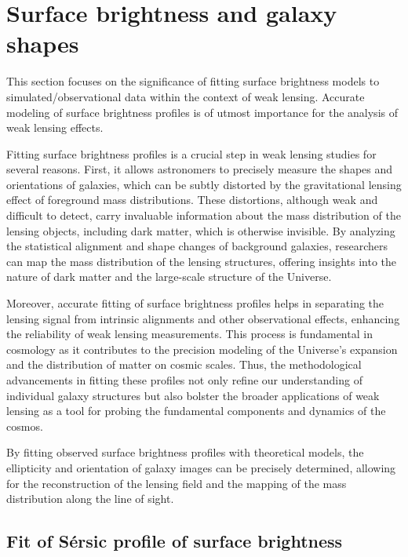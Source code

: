 \section{Surface brightness and galaxy shapes}
\label{sec:fit_light}

This section focuses on the significance of fitting surface brightness models to simulated/observational data within the context of weak lensing.
Accurate modeling of surface brightness profiles is of utmost importance for the analysis of weak lensing effects.

Fitting surface brightness profiles is a crucial step in weak lensing studies for several reasons. First, it allows astronomers to precisely measure the shapes and orientations of galaxies, which can be subtly distorted by the gravitational lensing effect of foreground mass distributions. These distortions, although weak and difficult to detect, carry invaluable information about the mass distribution of the lensing objects, including dark matter, which is otherwise invisible. By analyzing the statistical alignment and shape changes of background galaxies, researchers can map the mass distribution of the lensing structures, offering insights into the nature of dark matter and the large-scale structure of the Universe.

Moreover, accurate fitting of surface brightness profiles helps in separating the lensing signal from intrinsic alignments and other observational effects, enhancing the reliability of weak lensing measurements. This process is fundamental in cosmology as it contributes to the precision modeling of the Universe's expansion and the distribution of matter on cosmic scales. Thus, the methodological advancements in fitting these profiles not only refine our understanding of individual galaxy structures but also bolster the broader applications of weak lensing as a tool for probing the fundamental components and dynamics of the cosmos.

By fitting observed surface brightness profiles with theoretical models, the ellipticity and orientation of galaxy images can be precisely determined, allowing for the reconstruction of the lensing field and the mapping of the mass distribution along the line of sight.


\subsection{Fit of Sérsic profile of surface brightness}
\label{subsec:sersic_fit}

